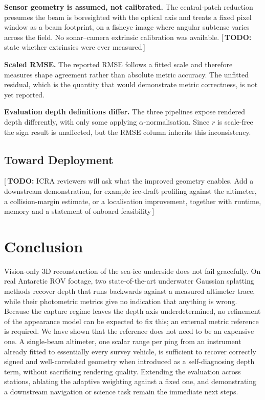 \documentclass[conference]{IEEEtran}
\newif\ifdraftnotes\draftnotestrue
\newcommand{\needswork}[1]{%
  \ifdraftnotes\textcolor{red!75!black}{\small[\,\textbf{TODO:} #1\,]}\fi}
\begin{document}
\textbf{Sensor geometry is assumed, not calibrated.} The central-patch reduction
presumes the beam is boresighted with the optical axis and treats a fixed pixel
window as a beam footprint, on a fisheye image where angular subtense varies
across the field. No sonar--camera extrinsic calibration was available.
\needswork{state whether extrinsics were ever measured}

\textbf{Scaled RMSE.} The reported RMSE follows a fitted scale and therefore
measures shape agreement rather than absolute metric accuracy. The unfitted
residual, which is the quantity that would demonstrate metric correctness, is
not yet reported.

\textbf{Evaluation depth definitions differ.} The three pipelines expose
rendered depth differently, with only some applying $\alpha$-normalisation.
Since $r$ is scale-free the sign result is unaffected, but the RMSE column
inherits this inconsistency.

\subsection{Toward Deployment}
\needswork{ICRA reviewers will ask what the improved geometry enables. Add a
downstream demonstration, for example ice-draft profiling against the
altimeter, a collision-margin estimate, or a localisation improvement, together
with runtime, memory and a statement of onboard feasibility}

\section{Conclusion}

Vision-only 3D reconstruction of the sea-ice underside does not fail gracefully.
On real Antarctic ROV footage, two state-of-the-art underwater Gaussian
splatting methods recover depth that runs backwards against a measured
altimeter trace, while their photometric metrics give no indication that
anything is wrong. Because the capture regime leaves the depth axis
underdetermined, no refinement of the appearance model can be expected to fix
this; an external metric reference is required. We have shown that the
reference does not need to be an expensive one. A single-beam altimeter, one
scalar range per ping from an instrument already fitted to essentially every
survey vehicle, is sufficient to recover correctly signed and
well-correlated geometry when introduced as a self-diagnosing depth term,
without sacrificing rendering quality. Extending the evaluation across stations,
ablating the adaptive weighting against a fixed one, and demonstrating a
downstream navigation or science task remain the immediate next steps.
\end{document}
